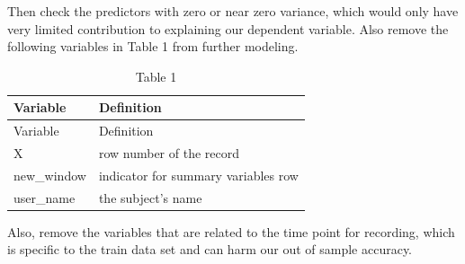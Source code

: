 \documentclass[]{article}
\newenvironment{Shaded}{\begin{snugshade}}{\end{snugshade}}
\newcommand{\KeywordTok}[1]{\textcolor[rgb]{0.13,0.29,0.53}{\textbf{#1}}}
\newcommand{\DataTypeTok}[1]{\textcolor[rgb]{0.13,0.29,0.53}{#1}}
\newcommand{\StringTok}[1]{\textcolor[rgb]{0.31,0.60,0.02}{#1}}
\newcommand{\CommentTok}[1]{\textcolor[rgb]{0.56,0.35,0.01}{\textit{#1}}}
\newcommand{\OtherTok}[1]{\textcolor[rgb]{0.56,0.35,0.01}{#1}}
\newcommand{\OperatorTok}[1]{\textcolor[rgb]{0.81,0.36,0.00}{\textbf{#1}}}
\newcommand{\NormalTok}[1]{#1}
\begin{document}
Then check the predictors with zero or near zero variance, which would
only have very limited contribution to explaining our dependent
variable. Also remove the following variables in Table 1 from further
modeling.

\begin{longtable}[]{@{}ll@{}}
\caption{Table 1}\tabularnewline
\toprule
Variable & Definition\tabularnewline
\midrule
\endfirsthead
\toprule
Variable & Definition\tabularnewline
\midrule
\endhead
X & row number of the record\tabularnewline
new\_window & indicator for summary variables row\tabularnewline
user\_name & the subject's name\tabularnewline
\bottomrule
\end{longtable}

\begin{Shaded}
\end{Shaded}

Also, remove the variables that are related to the time point for
recording, which is specific to the train data set and can harm our out
of sample accuracy.

\begin{Shaded}
\end{Shaded}
\end{document}
